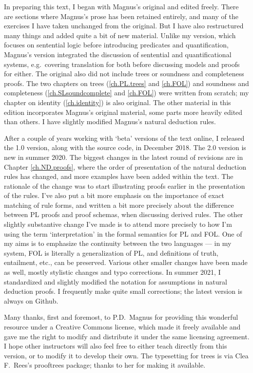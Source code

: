 In preparing this text, I began with Magnus's original and edited freely. There are sections where Magnus's prose has been retained entirely, and many of the exercises I have taken unchanged from the original. But I have also restructured many things and added quite a bit of new material. Unlike my version, which focuses on sentential logic before introducing predicates and quantification, Magnus's version integrated the discussion of sentential and quantificational systems, e.g.\ covering translation for both before discussing models and proofs for either. The original also did not include trees or soundness and completeness proofs. The two chapters on trees (\ref{ch.PL.trees} and \ref{ch.FOL}) and soundness and completeness (\ref{ch.SLsoundcomplete} and \ref{ch.FOL}) were written from scratch; my chapter on identity (\ref{ch.identity}) is also original. The other material in this edition incorporates Magnus's original material, some parts more heavily edited than others. I have slightly modified Magnus's natural deduction rules.

After a couple of years working with `beta' versions of the text online, I released the 1.0 version, along with the source code, in December 2018. The 2.0 version is new in summer 2020. The biggest changes in the latest round of revisions are in Chapter \ref{ch.ND.proofs}, where the order of presentation of the natural deduction rules has changed, and more examples have been added within the text. The rationale of the change was to start illustrating proofs earlier in the presentation of the rules. I've also put a bit more emphasis on the importance of exact matching of rule forms, and written a bit more precisely about the difference between PL proofs and proof schemas, when discussing derived rules. The other slightly substantive change I've made is to attend more precisely to how I'm using the term `interpretation' in the formal semantics for PL and FOL. One of my aims is to emphasize the continuity between the two languages --- in my system, FOL is literally a generalization of PL, and definitions of truth, entailment, etc., can be preserved. Various other smaller changes have been made as well, mostly stylistic changes and typo corrections. In summer 2021, I standardized and slightly modified the notation for assumptions in natural deduction proofs. I frequently make quite small corrections; the latest version is always on Github.

Many thanks, first and foremost, to P.D.\ Magnus for providing this wonderful resource under a Creative Commons license, which made it freely available and gave me the right to modify and distribute it under the same licensing agreement. I hope other instructors will also feel free to either teach directly from this version, or to modify it to develop their own. The typesetting for trees is via Clea F.\ Rees's prooftrees package; thanks to her for making it available.

